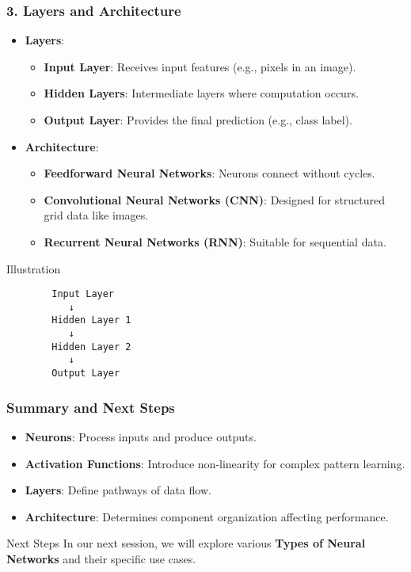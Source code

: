 \documentclass[aspectratio=169]{beamer}
\begin{document}
\begin{frame}[fragile]
    \frametitle{3. Layers and Architecture}
    \begin{itemize}
        \item \textbf{Layers}:
            \begin{itemize}
                \item \textbf{Input Layer}: Receives input features (e.g., pixels in an image).
                \item \textbf{Hidden Layers}: Intermediate layers where computation occurs. 
                \item \textbf{Output Layer}: Provides the final prediction (e.g., class label).
            \end{itemize}
        \item \textbf{Architecture}:
            \begin{itemize}
                \item \textbf{Feedforward Neural Networks}: Neurons connect without cycles.
                \item \textbf{Convolutional Neural Networks (CNN)}: Designed for structured grid data like images.
                \item \textbf{Recurrent Neural Networks (RNN)}: Suitable for sequential data.
            \end{itemize}
    \end{itemize}
    \begin{block}{Illustration}
        \begin{verbatim}
        Input Layer
           ↓
        Hidden Layer 1
           ↓
        Hidden Layer 2
           ↓
        Output Layer
        \end{verbatim}
    \end{block}
\end{frame}

\begin{frame}[fragile]
    \frametitle{Summary and Next Steps}
    \begin{itemize}
        \item \textbf{Neurons}: Process inputs and produce outputs.
        \item \textbf{Activation Functions}: Introduce non-linearity for complex pattern learning.
        \item \textbf{Layers}: Define pathways of data flow.
        \item \textbf{Architecture}: Determines component organization affecting performance.
    \end{itemize}
    \begin{block}{Next Steps}
        In our next session, we will explore various \textbf{Types of Neural Networks} and their specific use cases.
    \end{block}
\end{frame}
\end{document}
